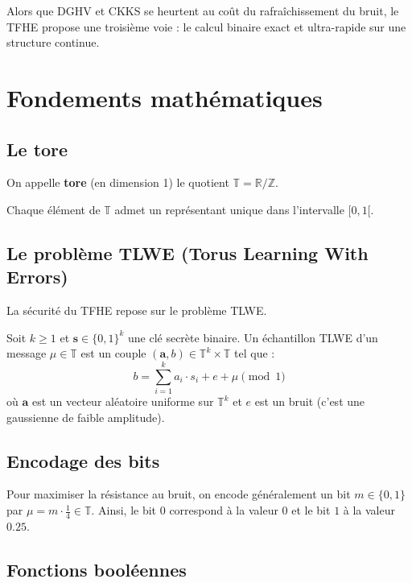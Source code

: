 Alors que DGHV et CKKS se heurtent au coût du rafraîchissement du bruit, le TFHE propose une troisième voie : le calcul binaire exact et ultra-rapide sur une structure continue.

\section{Fondements mathématiques}

\subsection{Le tore}

\begin{definition}[Tore]
On appelle \textbf{tore} (en dimension 1) le quotient $\mathbb{T} = \mathbb{R} / \mathbb{Z}$.
\end{definition}

\begin{proposition}
Chaque élément de $\mathbb{T}$ admet un représentant unique dans l’intervalle $[0,1[$.
\end{proposition}

\subsection{Le problème TLWE (Torus Learning With Errors)}

La sécurité du TFHE repose sur le problème TLWE.

\begin{definition}
Soit $k \ge 1$ et $\mathbf{s} \in \{0,1\}^k$ une clé secrète binaire. Un échantillon TLWE d'un message $\mu \in \mathbb{T}$ est un couple $(\mathbf{a}, b) \in \mathbb{T}^k \times \mathbb{T}$ tel que :
\[
b = \sum_{i=1}^{k} a_i \cdot s_i + e + \mu \pmod 1
\]
où $\mathbf{a}$ est un vecteur aléatoire uniforme sur $\mathbb{T}^k$ et $e$ est un bruit (c'est une gaussienne de faible amplitude).
\end{definition}

\subsection{Encodage des bits}

Pour maximiser la résistance au bruit, on encode généralement un bit $m \in \{0,1\}$ par $\mu = m \cdot \frac{1}{4} \in \mathbb{T}$. Ainsi, le bit $0$ correspond à la valeur $0$ et le bit $1$ à la valeur $0.25$.

\subsection{Fonctions booléennes}

